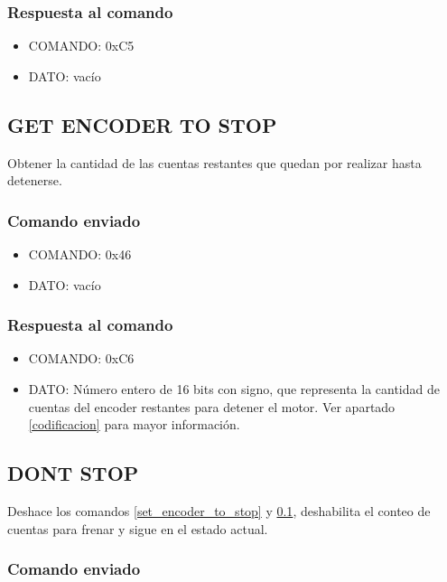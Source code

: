 \documentclass[a4paper,10pt]{article}
\begin{document}
\subsubsection*{Respuesta al comando}

\begin{itemize}
	\item{COMANDO:} 0xC5
	\item{DATO:} vac\'io
\end{itemize}

\subsection{GET ENCODER TO STOP}
\label{get_encoder_to_stop}

Obtener la cantidad de las cuentas restantes que quedan por realizar hasta detenerse.

\subsubsection*{Comando enviado}

\begin{itemize}
	\item{COMANDO:} 0x46
	\item{DATO:} vac\'io
\end{itemize}

\subsubsection*{Respuesta al comando}

\begin{itemize}
	\item{COMANDO:} 0xC6
	\item{DATO:} N\'umero entero de 16 bits con signo, que representa la cantidad de cuentas del encoder restantes para detener el motor.
		Ver apartado \ref{codificacion} para mayor informaci\'on.
\end{itemize}

\subsection{DONT STOP}
\label{dont_stop}

Deshace los comandos \ref{set_encoder_to_stop} y \ref{get_encoder_to_stop}, deshabilita el conteo de cuentas para frenar y sigue en el estado actual.

\subsubsection*{Comando enviado}
\end{document}
